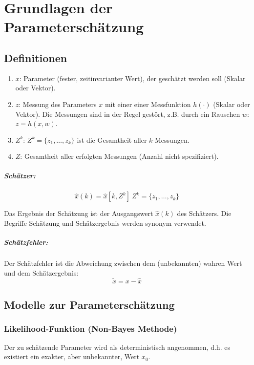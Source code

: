 \chapter{Grundlagen der Parameterschätzung}
\section{Definitionen}
\begin{enumerate}
    \item $x$: Parameter (fester, zeitinvarianter Wert), der geschätzt werden soll (Skalar oder Vektor).
    \item $z$: Messung des Parameters $x$ mit einer einer Messfunktion $h(\cdot)$ (Skalar oder Vektor).
        Die Messungen sind in der Regel gestört, z.B. durch ein Rauschen $w$: $z = h(x, w)$.
    \item $Z^k$: $Z^k = \{z_1, \ldots, z_k\}$ ist die Gesamtheit aller $k$-Messungen.
    \item $Z$: Gesamtheit aller erfolgten Messungen (Anzahl nicht spezifiziert).
\end{enumerate}

\paragraph{Schätzer:}
\begin{equation*}
    \hat{x}(k) = \hat{x}[k, Z^k]\ Z^k = \{z_1, \ldots, z_k\}
\end{equation*}

Das Ergebnis der Schätzung ist der Ausgangswert $\hat{x}(k)$ des Schätzers. 
Die Begriffe Schätzung und Schätzergebnis werden synonym verwendet.

\paragraph{Schätzfehler:}
Der Schätzfehler ist die Abweichung zwischen dem (unbekannten) wahren Wert und dem Schätzergebnis:
\begin{equation*}
    \tilde{x} = x - \hat{x}
\end{equation*}

\section{Modelle zur Parameterschätzung}
\subsection{Likelihood-Funktion (Non-Bayes Methode)}
Der zu schätzende Parameter wird als deterministisch angenommen, d.h. es existiert ein exakter, aber unbekannter, 
Wert $x_0$.

